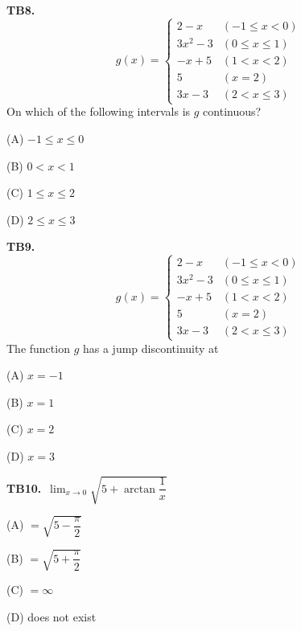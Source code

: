 \documentclass[11pt]{article}
\begin{document}
\bigskip\noindent\textbf{TB8.}\ \[
g(x) = \begin{cases}
2-x & (-1 \leq x < 0) \\
3x^2-3 & (0 \leq x \leq 1) \\
-x+5 & (1 < x < 2) \\
5 & (x = 2) \\
3x-3 & (2 < x \leq 3)
\end{cases}
\]
On which of the following intervals is $g$ continuous?
\begin{list}{}{\setlength{\leftmargin}{3em}\setlength{\labelwidth}{2.5em}\setlength{\itemsep}{0pt}\setlength{\topsep}{2pt}}
\item[(A)] $-1 \leq x \leq 0$
\item[(B)] $0 < x < 1$
\item[(C)] $1 \leq x \leq 2$
\item[(D)] $2 \leq x \leq 3$
\end{list}

\bigskip\noindent\textbf{TB9.}\ \[
g(x) = \begin{cases}
2-x & (-1 \leq x < 0) \\
3x^2-3 & (0 \leq x \leq 1) \\
-x+5 & (1 < x < 2) \\
5 & (x = 2) \\
3x-3 & (2 < x \leq 3)
\end{cases}
\]
The function $g$ has a jump discontinuity at
\begin{list}{}{\setlength{\leftmargin}{3em}\setlength{\labelwidth}{2.5em}\setlength{\itemsep}{0pt}\setlength{\topsep}{2pt}}
\item[(A)] $x = -1$
\item[(B)] $x = 1$
\item[(C)] $x = 2$
\item[(D)] $x = 3$
\end{list}

\bigskip\noindent\textbf{TB10.}\ $\displaystyle\lim_{x\to 0} \sqrt{5+\arctan\dfrac{1}{x}}$
\begin{list}{}{\setlength{\leftmargin}{3em}\setlength{\labelwidth}{2.5em}\setlength{\itemsep}{0pt}\setlength{\topsep}{2pt}}
\item[(A)] $=\sqrt{5-\dfrac{\pi}{2}}$
\item[(B)] $=\sqrt{5+\dfrac{\pi}{2}}$
\item[(C)] $=\infty$
\item[(D)] does not exist
\end{list}
\end{document}
